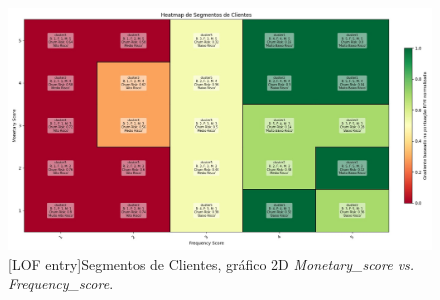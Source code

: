 \documentclass{easychair}
\begin{document}
\begin{figure}[H]
    \begin{centering}
    \includegraphics[width=0.8\linewidth]{imagens/figure27.jpg}\label{cap-5-fig27}
    [LOF entry]{Segmentos de Clientes, gráfico 2D \textit{Monetary_score vs. Frequency_score}.}
    \label{fig76}
    \end{centering}
\end{figure}
\end{document}

